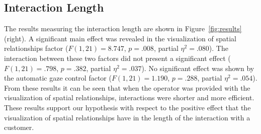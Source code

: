 \documentclass[a4paper, 10pt, conference]{ieeeconf}     %
\begin{document}

\subsection{Interaction Length}
The results measuring the interaction length are shown in Figure~\ref{fig:results} (right).
A significant main effect was revealed in the visualization of spatial relationships factor ($F(1,21)=8.747$, $p=.008$, partial $\eta^2=.080$).
The interaction between these two factors did not present a significant effect ($F(1,21)=.798$, $p=.382$, partial $\eta^2=.037$).
No significant effect was shown by the automatic gaze control factor ($F(1,21)=1.190$, $p=.288$, partial $\eta^2=.054$).
From these results it can be seen that when the operator was provided with the visualization of spatial relationships, interactions were shorter and more efficient.
These results support our hypothesis with respect to the positive effect that the visualization of spatial relationships have in the length of the interaction with a customer. 

\end{document}

